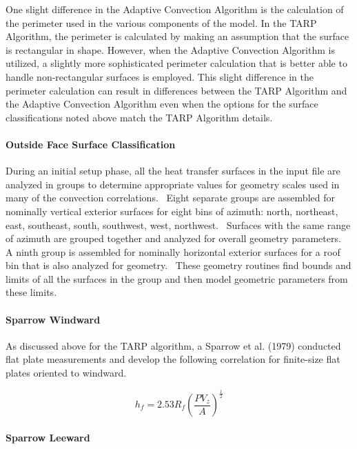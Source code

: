 One slight difference in the Adaptive Convection Algorithm is the calculation of the perimeter used in the various components of the model.  In the TARP Algorithm, the perimeter is calculated by making an assumption that the surface is rectangular in shape.  However, when the Adaptive Convection Algorithm is utilized, a slightly more sophisticated perimeter calculation that is better able to handle non-rectangular surfaces is employed.  This slight difference in the perimeter calculation can result in differences between the TARP Algorithm and the Adaptive Convection Algorithm even when the options for the surface classifications noted above match the TARP Algorithm details.

\paragraph{Outside Face Surface Classification}\label{outside-face-surface-classification}

During an initial setup phase, all the heat transfer surfaces in the input file are analyzed in groups to determine appropriate values for geometry scales used in many of the convection correlations.~ Eight separate groups are assembled for nominally vertical exterior surfaces for eight bins of azimuth: north, northeast, east, southeast, south, southwest, west, northwest.~ Surfaces with the same range of azimuth are grouped together and analyzed for overall geometry parameters.~ A ninth group is assembled for nominally horizontal exterior surfaces for a roof bin that is also analyzed for geometry.~ These geometry routines find bounds and limits of all the surfaces in the group and then model geometric parameters from these limits.

\paragraph{Sparrow Windward}\label{sparrow-windward}

As discussed above for the TARP algorithm, a Sparrow et al. (1979) conducted flat plate measurements and develop the following correlation for finite-size flat plates oriented to windward.

\begin{equation}
{h_f} = 2.53{R_f}{\left( {\frac{{P{V_z}}}{A}} \right)^{{\frac{1}{2}}}}
\end{equation}

\paragraph{Sparrow Leeward}\label{sparrow-leeward}

